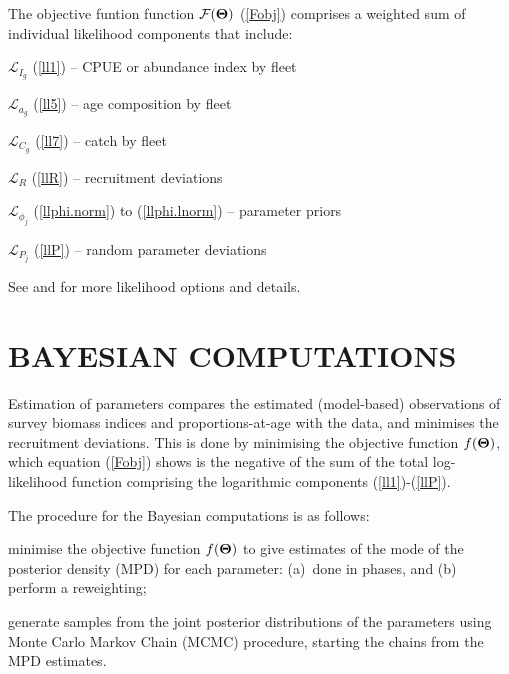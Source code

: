 \documentclass[11pt]{book}
\newcommand{\Lagr}{\mathcal{L}}%
\newcommand{\Fobj}{\mathcal{F}}%
\def\bfTh{{\bf \Theta}}%
\def\bfTh{{\bf \Theta}}%
\newcommand{\eref}[1]{(\ref{#1})}
\begin{document}
The objective funtion function $\Fobj(\bfTh)$ \eref{Fobj} comprises a weighted sum of individual likelihood components that include:
\begin{itemize_csas}{}{}
  \item $\Lagr_{I_g}$ \eref{ll1} -- CPUE or abundance index by fleet
  \item $\Lagr_{a_g}$ \eref{ll5} -- age composition by fleet
  \item $\Lagr_{C_g}$ \eref{ll7} -- catch by fleet
  \item $\Lagr_{R}$ \eref{llR}   --  recruitment deviations
  \item $\Lagr_{\phi_j}$ \eref{llphi.norm} to \eref{llphi.lnorm} -- parameter priors
  \item $\Lagr_{P_j}$ \eref{llP} -- random parameter deviations
\end{itemize_csas}
See \citet{Methot-Wetzel:2013} and \citet{Methot-etal:2021} for more likelihood options and details.

\section{BAYESIAN COMPUTATIONS}

Estimation of parameters compares the estimated (model-based) observations of survey biomass indices and proportions-at-age with the data, and minimises the recruitment deviations. 
This is done by minimising the objective function $f(\bfTh)$, which equation \eref{Fobj} shows is the negative of the sum of the total log-likelihood function comprising the logarithmic components \eref{ll1}-\eref{llP}.

The procedure for the Bayesian computations is as follows:
\begin{enumerate_csas}{}{}
  \item minimise the objective function $f(\bfTh)$ to give estimates of the mode of the posterior density (MPD) for each parameter: (a)~done in phases, and (b)~ perform a reweighting;
  \item generate samples from the joint posterior distributions of the parameters using Monte Carlo Markov Chain (MCMC) procedure, starting the chains from the MPD estimates.
\end{enumerate_csas}
\end{document}

